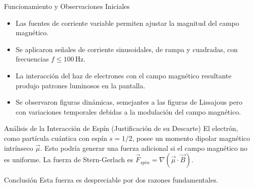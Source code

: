 \documentclass{beamer}
\begin{document}
\begin{frame}{Funcionamiento y Observaciones Iniciales}
  \begin{itemize}
    \item Las fuentes de corriente variable permiten ajustar la magnitud del campo magnético.
    \item Se aplicaron señales de corriente sinusoidales, de rampa y cuadradas, con frecuencias $f \le 100 \, \text{Hz}$.
    \item La interacción del haz de electrones con el campo magnético resultante produjo patrones luminosos en la pantalla.
    \item Se observaron figuras dinámicas, semejantes a las figuras de Lissajous pero con variaciones temporales debidas a la modulación del campo magnético.
  \end{itemize}
\end{frame}

\begin{frame}{Análisis de la Interacción de Espín (Justificación de su Descarte)}
  El electrón, como partícula cuántica con espín $s=1/2$, posee un momento dipolar magnético intrínseco $\vec{\mu}$. Esto podría generar una fuerza adicional si el campo magnético no es uniforme. La fuerza de Stern-Gerlach es $\vec{F}_{spin} = \nabla(\vec{\mu} \cdot \vec{B})$.

  \begin{alertblock}{Conclusión}
    Esta fuerza es despreciable por dos razones fundamentales.
  \end{alertblock}
\end{frame}
\end{document}
